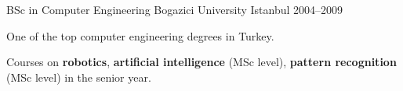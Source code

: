 \begin{cventries}
  \cventry
    {BSc in Computer Engineering} %
    {Bogazici University} %
    {Istanbul} %
    {2004--2009} %
    {
      \begin{cvitems} %
        \item {One of the top computer engineering degrees in Turkey.}
        \item {Courses on \textbf{robotics}, \textbf{artificial intelligence} (MSc level), \textbf{pattern recognition} (MSc level) in the senior year.}
      \end{cvitems}
    }
    {}

\end{cventries}
